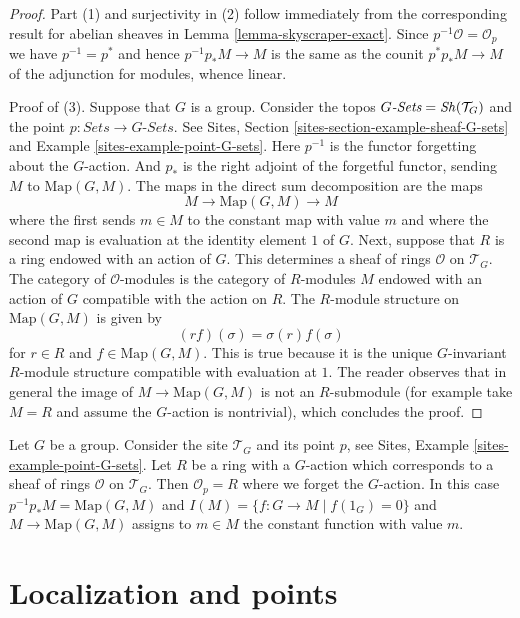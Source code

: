 \begin{proof}
Part (1) and surjectivity in (2)
follow immediately from the corresponding result for abelian
sheaves in
Lemma \ref{lemma-skyscraper-exact}.
Since $p^{-1}\mathcal{O} = \mathcal{O}_p$
we have $p^{-1} = p^*$ and hence $p^{-1}p_*M \to M$
is the same as the counit $p^*p_*M \to M$
of the adjunction for modules, whence linear.

\medskip\noindent
Proof of (3). Suppose that $G$ is a group. Consider the topos
$G\textit{-Sets} = \mathop{\mathit{Sh}}\nolimits(\mathcal{T}_G)$
and the point $p : \textit{Sets} \to G\textit{-Sets}$.
See Sites, Section \ref{sites-section-example-sheaf-G-sets} and
Example \ref{sites-example-point-G-sets}.
Here $p^{-1}$ is the functor forgetting
about the $G$-action. And $p_*$ is the right adjoint
of the forgetful functor, sending $M$ to $\text{Map}(G, M)$.
The maps in the direct sum decomposition are the maps
$$
M \to \text{Map}(G, M) \to M
$$
where the first sends $m \in M$ to the constant map with value $m$ and
where the second map is evaluation at the identity element $1$ of $G$.
Next, suppose that $R$ is a ring endowed with an action of $G$.
This determines a sheaf of rings $\mathcal{O}$ on $\mathcal{T}_G$.
The category of $\mathcal{O}$-modules is the category of $R$-modules $M$
endowed with an action of $G$ compatible with the action on $R$.
The $R$-module structure on $\text{Map}(G, M)$ is given by
$$
( r f ) (\sigma) = \sigma(r) f(\sigma)
$$
for $r \in R$ and $f \in \text{Map}(G, M)$. This is true because it is the
unique $G$-invariant $R$-module structure compatible with evaluation at $1$.
The reader observes that in general the image of $M \to \text{Map}(G, M)$
is not an $R$-submodule (for example take $M = R$ and assume the
$G$-action is nontrivial), which concludes the proof.
\end{proof}

\begin{example}
\label{example-ring-with-group-action}
Let $G$ be a group. Consider the site
$\mathcal{T}_G$ and its point $p$, see
Sites, Example \ref{sites-example-point-G-sets}.
Let $R$ be a ring with a $G$-action which corresponds to
a sheaf of rings $\mathcal{O}$ on $\mathcal{T}_G$.
Then $\mathcal{O}_p = R$ where we forget the $G$-action.
In this case $p^{-1}p_*M = \text{Map}(G, M)$ and
$I(M) = \{f : G \to M \mid f(1_G) = 0\}$ and
$M \to \text{Map}(G, M)$ assigns to $m \in M$ the constant
function with value $m$.
\end{example}




\section{Localization and points}
\label{section-localize-points}

